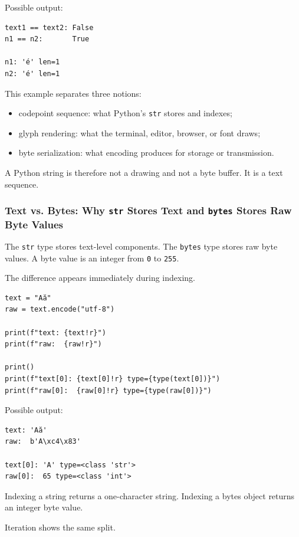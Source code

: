 Possible output:

\begin{verbatim}
text1 == text2: False
n1 == n2:       True

n1: 'é' len=1
n2: 'é' len=1
\end{verbatim}

This example separates three notions:

\begin{itemize}
    \item codepoint sequence: what Python's \texttt{str} stores and indexes;
    \item glyph rendering: what the terminal, editor, browser, or font draws;
    \item byte serialization: what encoding produces for storage or transmission.
\end{itemize}

A Python string is therefore not a drawing and not a byte buffer. It is a text sequence.

\subsubsection{Text vs. Bytes: Why \texttt{str} Stores Text and \texttt{bytes} Stores Raw Byte Values}

The \texttt{str} type stores text-level components. The \texttt{bytes} type stores raw byte values. A byte value is an integer from \texttt{0} to \texttt{255}.

The difference appears immediately during indexing.

\begin{verbatim}
text = "Aă"
raw = text.encode("utf-8")

print(f"text: {text!r}")
print(f"raw:  {raw!r}")

print()
print(f"text[0]: {text[0]!r} type={type(text[0])}")
print(f"raw[0]:  {raw[0]!r} type={type(raw[0])}")
\end{verbatim}

Possible output:

\begin{verbatim}
text: 'Aă'
raw:  b'A\xc4\x83'

text[0]: 'A' type=<class 'str'>
raw[0]:  65 type=<class 'int'>
\end{verbatim}

Indexing a string returns a one-character string. Indexing a bytes object returns an integer byte value.

Iteration shows the same split.


